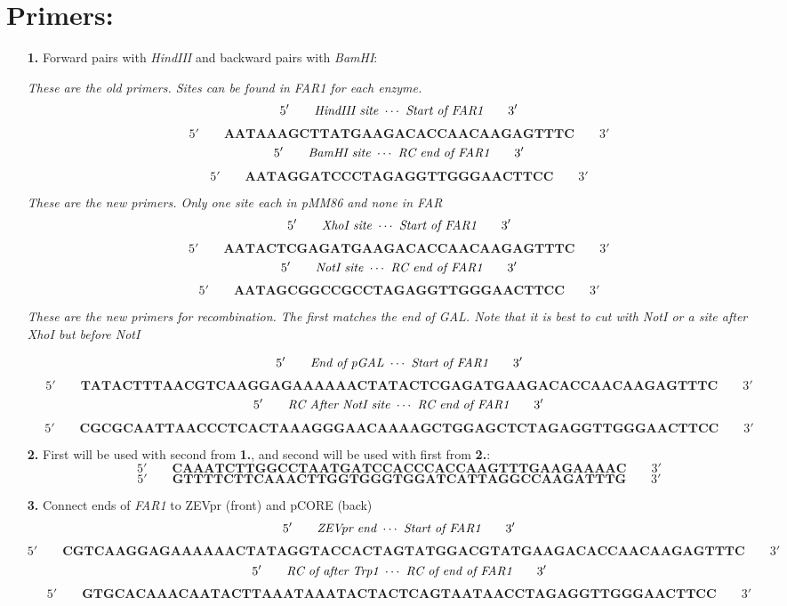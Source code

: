 \documentclass[landscape,a4paper]{article}
\begin{document}
\section*{Primers:}
\begin{itemize}
    \item[\textbf{1.}] Forward pairs with \emph{HindIII} and backward pairs with \emph{BamHI}:

        \emph{These are the old primers. Sites can be found in FAR1 for each enzyme.}
        \[ 5' \qquad \emph{HindIII site } \cdots \emph{ Start of FAR1} \qquad 3' \] 
        \[ 5'\qquad \textbf{AATAAAGCTTATGAAGACACCAACAAGAGTTTC} \qquad 3' \] 
        \[ 5' \qquad \emph{BamHI site } \cdots \emph{ RC end of FAR1} \qquad 3' \] 
        \[ 5'\qquad \textbf{AATAGGATCCCTAGAGGTTGGGAACTTCC} \qquad 3' \] 

        \emph{These are the new primers. Only one site each in pMM86 and none in FAR}
        \[ 5' \qquad \emph{XhoI site } \cdots \emph{ Start of FAR1} \qquad 3' \] 
        \[ 5'\qquad \textbf{AATACTCGAGATGAAGACACCAACAAGAGTTTC} \qquad 3' \] 
        \[ 5' \qquad \emph{NotI site } \cdots \emph{ RC end of FAR1} \qquad 3' \] 
        \[ 5'\qquad \textbf{AATAGCGGCCGCCTAGAGGTTGGGAACTTCC} \qquad 3' \] 


        \emph{These are the new primers for recombination. The first matches the end of GAL. Note that it is best to cut with NotI or a site after XhoI but before NotI}

        \[ 5' \qquad \emph{End of pGAL } \cdots \emph{ Start of FAR1} \qquad 3' \] 
        \[ 5'\qquad \textbf{TATACTTTAACGTCAAGGAGAAAAAACTATACTCGAGATGAAGACACCAACAAGAGTTTC} \qquad 3' \] 
        \[ 5' \qquad \emph{RC After NotI site } \cdots \emph{ RC end of FAR1} \qquad 3' \] 
        \[ 5'\qquad \textbf{CGCGCAATTAACCCTCACTAAAGGGAACAAAAGCTGGAGCTCTAGAGGTTGGGAACTTCC} \qquad 3' \] 

 
    \item[\textbf{2.}] First will be used with second from \textbf{1.}, and second will be used with first from \textbf{2.}:
        \[ 5' \qquad \textbf{CAAATCTTGGCCTAATGATCCACCCACCAAGTTTGAAGAAAAC} \qquad 3' \]
        \[ 5' \qquad \textbf{GTTTTCTTCAAACTTGGTGGGTGGATCATTAGGCCAAGATTTG} \qquad 3' \] 

    \item[\textbf{3.}] Connect ends of \emph{FAR1} to ZEVpr (front) and pCORE (back)\\

            \[ 5' \qquad \emph{ZEVpr end } \cdots \emph{ Start of FAR1} \qquad 3' \] 
        \[ 5' \qquad \textbf{CGTCAAGGAGAAAAAACTATAGGTACCACTAGTATGGACGTATGAAGACACCAACAAGAGTTTC} \qquad 3' \] 
            \[ 5' \qquad \emph{RC of after Trp1 } \cdots \emph{ RC of end of FAR1} \qquad 3' \] 
        \[ 5' \qquad \textbf{GTGCACAAACAATACTTAAATAAATACTACTCAGTAATAACCTAGAGGTTGGGAACTTCC} \qquad 3' \] 


\end{itemize}
\end{document}
